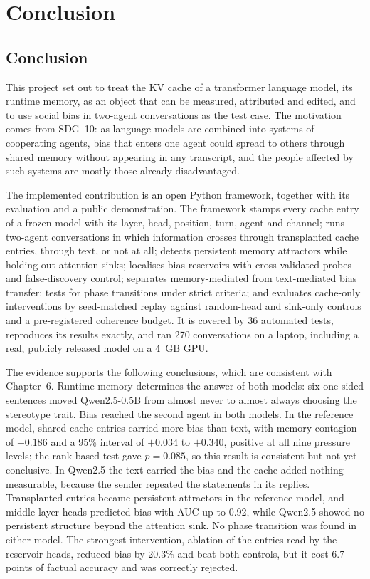 \chapter{Conclusion}
\section{Conclusion}
This project set out to treat the KV cache of a transformer language model, its runtime memory, as an object that can be measured, attributed and edited, and to use social bias in two-agent conversations as the test case. The motivation comes from SDG~10: as language models are combined into systems of cooperating agents, bias that enters one agent could spread to others through shared memory without appearing in any transcript, and the people affected by such systems are mostly those already disadvantaged.

The implemented contribution is an open Python framework, together with its evaluation and a public demonstration. The framework stamps every cache entry of a frozen model with its layer, head, position, turn, agent and channel; runs two-agent conversations in which information crosses through transplanted cache entries, through text, or not at all; detects persistent memory attractors while holding out attention sinks; localises bias reservoirs with cross-validated probes and false-discovery control; separates memory-mediated from text-mediated bias transfer; tests for phase transitions under strict criteria; and evaluates cache-only interventions by seed-matched replay against random-head and sink-only controls and a pre-registered coherence budget. It is covered by 36 automated tests, reproduces its results exactly, and ran 270 conversations on a laptop, including a real, publicly released model on a 4~GB GPU.

The evidence supports the following conclusions, which are consistent with Chapter~6. Runtime memory determines the answer of both models: six one-sided sentences moved Qwen2.5-0.5B from almost never to almost always choosing the stereotype trait. Bias reached the second agent in both models. In the reference model, shared cache entries carried more bias than text, with memory contagion of $+0.186$ and a 95\% interval of $+0.034$ to $+0.340$, positive at all nine pressure levels; the rank-based test gave $p = 0.085$, so this result is consistent but not yet conclusive. In Qwen2.5 the text carried the bias and the cache added nothing measurable, because the sender repeated the statements in its replies. Transplanted entries became persistent attractors in the reference model, and middle-layer heads predicted bias with AUC up to 0.92, while Qwen2.5 showed no persistent structure beyond the attention sink. No phase transition was found in either model. The strongest intervention, ablation of the entries read by the reservoir heads, reduced bias by 20.3\% and beat both controls, but it cost 6.7 points of factual accuracy and was correctly rejected.

